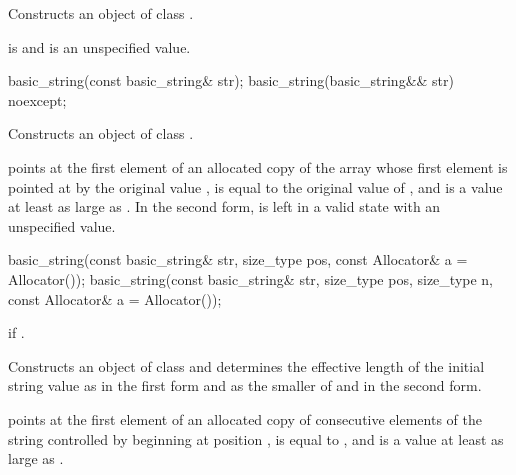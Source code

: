 \begin{itemdescr}
\pnum
\effects
Constructs an object of class .

\pnum
\postconditions
{} is  and  is an unspecified value.
\end{itemdescr}

%
\begin{itemdecl}
basic_string(const basic_string& str);
basic_string(basic_string&& str) noexcept;
\end{itemdecl}

\begin{itemdescr}
\pnum
\effects
Constructs an object of class .

\pnum
\postconditions
{} points at the first element of an allocated copy
of the array whose first element is pointed at by the original
value ,  is equal to the
original value of , and  is a value
at least as large as .
In the second form,  is left in a valid state with an unspecified value.
\end{itemdescr}

%
\begin{itemdecl}
basic_string(const basic_string& str, size_type pos,
             const Allocator& a = Allocator());
basic_string(const basic_string& str, size_type pos, size_type n,
             const Allocator& a = Allocator());
\end{itemdecl}

\begin{itemdescr}
\pnum
\throws
{}
if
.

\pnum
\effects
Constructs an object of class
and determines the effective length  of the initial string
value as  in the first form and
as the smaller of  and  in the second form.

\pnum
\postconditions
{} points at the first element of an allocated copy of 
consecutive elements of the string controlled by  beginning at position
,  is equal to , and  is a
value at least as large as .
\end{itemdescr}

